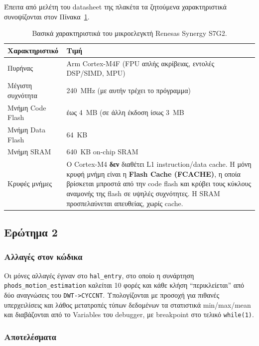 \documentclass[11pt,a4paper]{article}
\newcommand{\code}[1]{\texttt{#1}}
\newcommand{\en}[1]{\foreignlanguage{english}{#1}}
\begin{document}
Έπειτα από μελέτη του datasheet της πλακέτα τα ζητούμενα χαρακτηριστικά συνοψίζονται στον Πίνακα~\ref{tab:board}.

\begin{table}[H]
\centering
\caption{Βασικά χαρακτηριστικά του μικροελεγκτή Renesas Synergy S7G2.}
\label{tab:board}
\begin{tabularx}{\textwidth}{@{}l X@{}}
\toprule
\textbf{Χαρακτηριστικό} & \textbf{Τιμή} \\
\midrule
Πυρήνας & \en{Arm Cortex-M4F} (FPU απλής ακρίβειας, εντολές DSP/SIMD, MPU) \\
Μέγιστη συχνότητα & \SI{240}{MHz} (με αυτήν τρέχει το πρόγραμμα)\\
Μνήμη \en{Code Flash} & έως \SI{4}{MB} (σε άλλη έκδοση ίσως \SI{3}{MB} \\
Μνήμη \en{Data Flash} & \SI{64}{KB} \\
Μνήμη SRAM & \SI{640}{KB} on-chip SRAM \\
Κρυφές μνήμες & Ο \en{Cortex-M4} \textbf{δεν} διαθέτει \en{L1 instruction/data cache}.
  Η μόνη κρυφή μνήμη είναι η \textbf{\en{Flash Cache (FCACHE)}}, η οποία βρίσκεται μπροστά από την
  \en{code flash} και κρύβει τους κύκλους αναμονής της flash σε υψηλές
  συχνότητες. Η SRAM προσπελαύνεται απευθείας, χωρίς \en{cache}. \\
\bottomrule
\end{tabularx}
\end{table}

\subsection{Ερώτημα 2}

\subsubsection*{Αλλαγές στον κώδικα}

Οι μόνες αλλαγές
έγιναν στο \code{hal\_entry}, στο οποίο η συνάρτηση \code{phods\_motion\_estimation} καλείται 10 φορές και κάθε κλήση ``περικλείεται'' από δύο
αναγνώσεις του \code{DWT->CYCCNT}. Υπολογίζονται με προσοχή για πιθανές υπερχειλίσεις και λάθος μετατροπές τύπων δεδομένων τα στατιστικά min/max/mean και διαβάζονται από το \en{Variables} του \en{debugger}, με \en{breakpoint} στο τελικό
\code{while(1)}. 

\subsubsection*{Αποτελέσματα}
\end{document}

